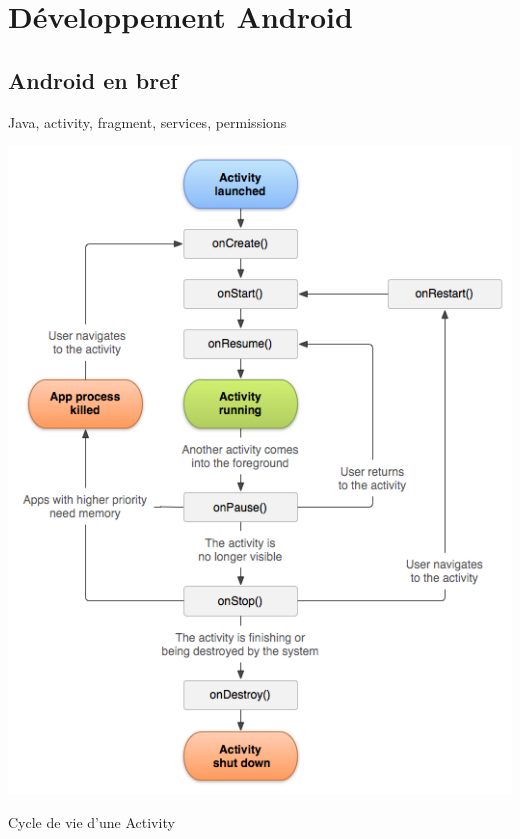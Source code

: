 \chapter{Développement Android}
\section{Android en bref}
Java, activity, fragment, services, permissions

\bigskip
\begin{img}
  \includegraphics[scale=0.5]{img/cycle.png}
  \caption{Cycle de vie d'une Activity}
\end{img}



